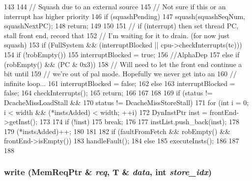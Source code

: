 \begin{DoxyCode}
143 {
144     // Squash due to an external source
145     // Not sure if this or an interrupt has higher priority
146     if (squashPending) {
147         squash(squashSeqNum, squashNextPC);
148         return;
149     }
150 
151     // if (interrupt) then set thread PC, stall front end, record that
152     // I'm waiting for it to drain.  (for now just squash)
153     if (FullSystem && (interruptBlocked || cpu->checkInterrupts(tc))) {
154         if (!robEmpty()) {
155             interruptBlocked = true;
156         //AlphaDep
157         } else if (robEmpty() && (PC & 0x3)) {
158             // Will need to let the front end continue a bit until
159             // we're out of pal mode.  Hopefully we never get into an
160             // infinite loop...
161             interruptBlocked = false;
162         } else {
163             interruptBlocked = false;
164             checkInterrupts();
165             return;
166         }
167     }
168 
169     if (status != DcacheMissLoadStall &&
170         status != DcacheMissStoreStall) {
171         for (int i = 0; i < width && (*instsAdded) < width; ++i) {
172             DynInstPtr inst = frontEnd->getInst();
173 
174             if (!inst)
175                 break;
176 
177             instList.push_back(inst);
178 
179             (*instsAdded)++;
180         }
181 
182         if (faultFromFetch && robEmpty() && frontEnd->isEmpty()) {
183             handleFault();
184         } else {
185             executeInsts();
186         }
187     }
188 }
\end{DoxyCode}
\hypertarget{classInorderBackEnd_a173162a41482ee35c5a15394b4befa4b}{
\subsubsection[{write}]{ write (MemReqPtr \& {\em req}, \/  T \& {\em data}, \/  int {\em store\_\-idx})}}
\label{classInorderBackEnd_a173162a41482ee35c5a15394b4befa4b}



